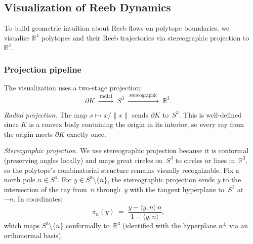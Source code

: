 %
%

\subsection{Visualization of Reeb Dynamics}
\label{sec:visualization}

To build geometric intuition about Reeb flows on polytope boundaries,
we visualize $\mathbb{R}^4$ polytopes and their Reeb trajectories via
stereographic projection to~$\mathbb{R}^3$.

\subsubsection*{Projection pipeline}

The visualization uses a two-stage projection:
\[
  \partial K \;\xrightarrow{\;\text{radial}\;}\; S^3
  \;\xrightarrow{\;\text{stereographic}\;}\; \mathbb{R}^3.
\]

\emph{Radial projection.}
The map $x \mapsto x / \lVert x \rVert$ sends $\partial K$ to~$S^3$.
This is well-defined since $K$ is a convex body containing the origin
in its interior, so every ray from the origin meets $\partial K$
exactly once.

\emph{Stereographic projection.}
We use stereographic projection because it is conformal
(preserving angles locally) and maps great circles on~$S^3$
to circles or lines in~$\mathbb{R}^3$, so the polytope's
combinatorial structure remains visually recognizable.
Fix a north pole $n \in S^3$. For $y \in S^3 \setminus \{n\}$,
the stereographic projection sends $y$ to the intersection of the ray
from~$n$ through~$y$ with the tangent hyperplane to~$S^3$ at~$-n$.
In coordinates:
\begin{equation}
  \label{eq:stereo-proj}
  \pi_n(y) \;=\; \frac{y - \langle y, n \rangle \, n}{1 - \langle y, n \rangle},
\end{equation}
which maps $S^3 \setminus \{n\}$ conformally to~$\mathbb{R}^3$
(identified with the hyperplane $n^\perp$ via an orthonormal basis).


